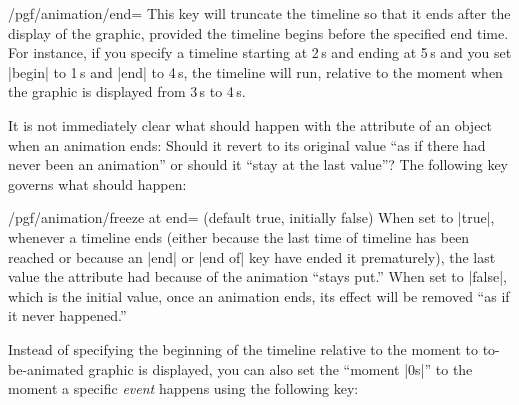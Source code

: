 \begin{key}{/pgf/animation/end=}
  This key will truncate the timeline so that it ends 
  after the display of the graphic, provided the timeline begins
  before the specified end time. For instance, if you specify a
  timeline starting at 2\,s and ending at 5\,s and you set |begin| to
  1\,s and |end| to 4\,s, the timeline will run, relative to the moment
  when the graphic is displayed from 3\,s to 4\,s.
  
\begin{codeexample}[width=3cm]
\end{codeexample}
\end{key}

It is not immediately clear what should happen with the attribute of
an object when an animation ends: Should it revert to its original
value ``as if there had never been an animation'' or should it ``stay
at the last value''? The following key governs what should happen:

\begin{key}{/pgf/animation/freeze at end= (default
  true, initially false)}
  When set to |true|, whenever a timeline ends (either because the
  last time of timeline has been reached or because an |end| or
  |end of| key have ended it prematurely), the last value the
  attribute had because of the animation ``stays put.'' When set to
  |false|, which is the initial value, once an animation ends, its
  effect will be removed ``as if it never happened.''
\begin{codeexample}[width=2cm]
\end{codeexample}
\end{key}

Instead of specifying the beginning of the timeline relative to the
moment to to-be-animated graphic is displayed, you can also set the
``moment |0s|'' to the moment a specific \emph{event} happens using
the following key:

